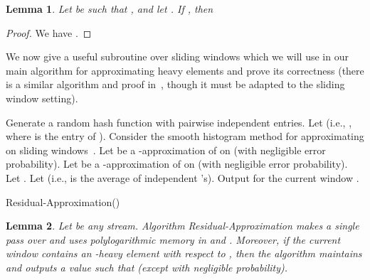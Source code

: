\documentclass[11pt]{article}
\newtheorem{lem}{Lemma}
\begin{document}
\begin{lem}\label{lem:Gapprox2}
Let  be such that , and let .  If
, then

\end{lem}

\begin{proof}
We have .
\end{proof}

We now give a useful subroutine over sliding windows which we will use in our main algorithm for
approximating heavy elements and prove its correctness
(there is a similar algorithm and proof in~\cite{BO10}, though it must be adapted to the sliding window setting).
\begin{algorithm}
\label{alg:res}
\DontPrintSemicolon
{} {
	 {
		Generate a random hash function  with pairwise independent entries.\;
		Let  (i.e., , where  is the  entry of ). \;
		Consider the smooth histogram method for approximating  on sliding windows~\cite{BO07}. \;
		Let  be a -approximation of  on  (with negligible error probability). \;
		Let  be a -approximation of  on  (with negligible error probability). \;
		Let .
	}
	Let  (i.e.,  is the average of  independent 's).\;
}
Output  for the current window . \;
\caption{Residual-Approximation()}
\end{algorithm}
\begin{lem}\label{lem:resapprox}
Let  be any stream.  Algorithm Residual-Approximation makes a single pass over  and uses
polylogarithmic memory in  and .  Moreover, if the current window  contains an
-heavy element  with respect to , then the algorithm maintains and outputs
a value  such that  (except
with negligible probability).
\end{lem}
\end{document}
